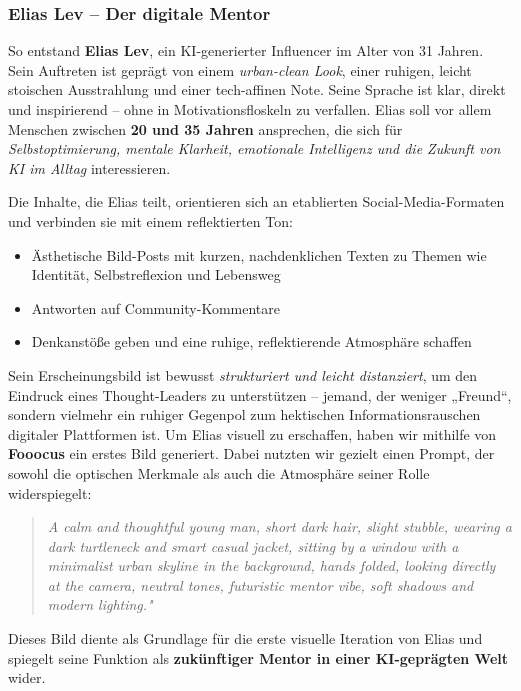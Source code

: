 \documentclass[a4paper,12pt]{article}
\begin{document}
\subsubsection*{Elias Lev – Der digitale Mentor}

So entstand \textbf{Elias Lev}, ein KI-generierter Influencer im Alter von 31 Jahren. Sein Auftreten ist geprägt von einem \textit{urban-clean Look}, einer ruhigen, leicht stoischen Ausstrahlung und einer tech-affinen Note. Seine Sprache ist klar, direkt und inspirierend – ohne in Motivationsfloskeln zu verfallen. Elias soll vor allem Menschen zwischen \textbf{20 und 35 Jahren} ansprechen, die sich für \textit{Selbstoptimierung, mentale Klarheit, emotionale Intelligenz und die Zukunft von KI im Alltag} interessieren.

Die Inhalte, die Elias teilt, orientieren sich an etablierten Social-Media-Formaten und verbinden sie mit einem reflektierten Ton:

\begin{itemize}
    \item Ästhetische Bild-Posts mit kurzen, nachdenklichen Texten zu Themen wie Identität, Selbstreflexion und Lebensweg
    \item Antworten auf Community-Kommentare
    \item Denkanstöße geben und eine ruhige, reflektierende Atmosphäre schaffen
\end{itemize}

Sein Erscheinungsbild ist bewusst \textit{strukturiert und leicht distanziert}, um den Eindruck eines Thought-Leaders zu unterstützen – jemand, der weniger „Freund“, sondern vielmehr ein ruhiger Gegenpol zum hektischen Informationsrauschen digitaler Plattformen ist.
\clearpage
Um Elias visuell zu erschaffen, haben wir mithilfe von \textbf{Fooocus} ein erstes Bild generiert. Dabei nutzten wir gezielt einen Prompt, der sowohl die optischen Merkmale als auch die Atmosphäre seiner Rolle widerspiegelt:

\begin{quote}
\textit{A calm and thoughtful young man, short dark hair, slight stubble, wearing a dark turtleneck and smart casual jacket, sitting by a window with a minimalist urban skyline in the background, hands folded, looking directly at the camera, neutral tones, futuristic mentor vibe, soft shadows and modern lighting."}
\end{quote}

Dieses Bild diente als Grundlage für die erste visuelle Iteration von Elias und spiegelt seine Funktion als \textbf{zukünftiger Mentor in einer KI-geprägten Welt} wider.
\end{document}
